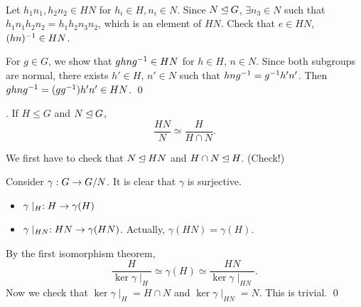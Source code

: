 \pf \\
 Let \(h_1n_1, h_2n_2 \in HN\) for \(h_i \in H, n_i \in N\). Since \(N \unlhd G\), \(\exists n_3 \in N\) such that \(h_1 n_1 h_2 n_2 = h_1 h_2 n_3 n_2\), which is an element of \(HN\). Check that \(e \in HN\), \((hn)^{-1} \in HN\).

 For \(g \in G\), we show that \(ghng^{-1} \in HN\) for \(h \in H\), \(n \in N\). Since both subgroups are normal, there exists \(h' \in H\), \(n' \in N\) such that \(hng^{-1} = g^{-1} h' n'\). Then \(ghng^{-1} = (gg^{-1})h'n' \in HN\). \qed

\medskip

\thm.  If \(H \leq G\) and \(N \unlhd G\),
\[
    \frac{HN}{N} \simeq \frac{H}{H\cap N}.
\]
\begin{center}
\end{center}

\pf We first have to check that \(N \unlhd HN\) and \(H\cap N \unlhd H\). (Check!)

Consider \(\gamma : G \rightarrow G/N\). It is clear that \(\gamma\) is surjective.
\begin{itemize}
    \item \(\gamma \mid_H: H \rightarrow \gamma(H)\)
    \item \(\gamma \mid_{HN}: HN \rightarrow \gamma(HN)\). Actually, \(\gamma(HN) = \gamma(H)\).
\end{itemize}
By the first isomorphism theorem,
\[
    \frac{H}{\ker \gamma\mid_H} \simeq \gamma(H) \simeq \frac{HN}{\ker \gamma \mid_{HN}}.
\]
Now we check that \(\ker \gamma\mid_H = H \cap N\) and \(\ker \gamma\mid_{HN} = N\). This is trivial. \qed

